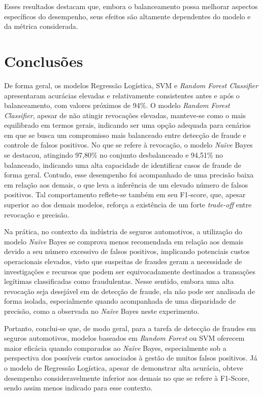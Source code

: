 \documentclass[conference]{IEEEtran}
\begin{document}
Esses resultados destacam que, embora o balanceamento possa melhorar aspectos específicos do desempenho, seus efeitos são altamente dependentes do modelo e da métrica considerada.

\section{Conclusões}

De forma geral, os modelos Regressão Logística, SVM e \textit{Random Forest Classifier} apresentaram acurácias elevadas e relativamente consistentes antes e após o balanceamento, com valores próximos de 94\%. O modelo \textit{Random Forest Classifier}, apesar de não atingir revocações elevadas, manteve-se como o mais equilibrado em termos gerais, indicando ser uma opção adequada para cenários em que se busca um compromisso mais balanceado entre detecção de fraude e controle de falsos positivos. No que se refere à revocação, o modelo \textit{Naïve} Bayes se destacou, atingindo 97,80\% no conjunto desbalanceado e 94,51\% no balanceado, indicando uma alta capacidade de identificar casos de fraude de forma geral. Contudo, esse desempenho foi acompanhado de uma precisão baixa em relação aos demais, o que leva a inferência de um elevado número de falsos positivos. Tal comportamento reflete-se também em seu F1-score, que, apesar superior ao dos demais modelos, reforça a existência de um forte \textit{trade-off} entre revocação e precisão. 

Na prática, no contexto da indústria de seguros automotivos, a utilização do modelo \textit{Naïve} Bayes se comprova menos recomendada em relação aos demais devido a seu número excessivo de falsos positivos, implicando potenciais custos operacionais elevados, visto que suspeitas de fraudes geram a necessidade de investigações e recursos que podem ser equivocadamente destinados a transações legítimas classificadas como fraudulentas. Nesse sentido, embora uma alta revocação seja desejável em de detecção de fraude, ela não pode ser analisada de forma isolada, especialmente quando acompanhada de uma disparidade de precisão, como a observada no \textit{Naïve} Bayes neste experimento.

Portanto, conclui-se que, de modo geral, para a tarefa de detecção de fraudes em seguros automotivos, modelos baseados em \textit{Random Forest} ou SVM oferecem maior eficácia quando comparados ao \textit{Naïve} Bayes, especialmente sob a perspectiva dos possíveis custos associados à gestão de muitos falsos positivos. Já o modelo de Regressão Logística, apesar de demonstrar alta acurácia, obteve desempenho consideravelmente inferior aos demais no que se refere à F1-Score, sendo assim menos indicado para esse contexto.
\end{document}
